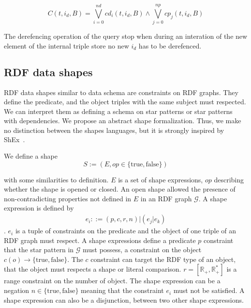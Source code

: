 \begin{equation}\label{eq:cReachabilityCriteria}
    C(t, i_d, B)  = \bigvee_{i=0}^{nd}cd_i(t, i_d, B) \land \bigvee_{j=0}^{np}cp_j(t, i_d, B)
\end{equation}

The derefencing operation of the query stop when during an interation of the new element of the internal triple store no new $i_d$ has to be derefenced.

\subsection{RDF data shapes}
RDF data shapes similar to data schema are constraints on RDF graphs.
They define the predicate, and the object triples with the same subject must respected.
We can interpret them as defining a schema on star patterns or star patterns with dependencies.
We propose an abstract shape formalization. Thus, we make no distinction between the shapes languages, but it is strongly inspired by ShEx~\cite{Gayo2018}.~

We define a shape
\begin{equation}
S := (E, op \in \{\mathrm{true},\mathrm{false}\})
\end{equation}

with some similarities to \citeauthor{Abbas2018} definition.
$E$ is a set of shape expressions, $op$ describing whether the shape is opened or closed.
An open shape allowed the presence of non-contradicting properties not defined in $E$ in an RDF graph $\mathcal{G}$.
A shape expression is defined by
\begin{align}
 e_i ::= (p, c, r, n) | (e_j|e_k)
\end{align}
.
$e_i$ is a tuple of constraints on the predicate and the object of one triple of an RDF graph must respect. 
A shape expressions define a predicate $p$ constraint that the star pattern in $\mathcal{G}$ must possess,
a constraint on the object $c(o) \rightarrow \{\mathrm{true}, \mathrm{false}\}$.
The $c$ constraint can target the RDF type of an object, that the object must respects a shape or literal comparison.
$r = [\mathbb{R}_+, \mathbb{R}_+^*]$ is a range constraint on the number of object.
The shape expression can be a negation $n \in \{\mathrm{true}, \mathrm{false}\}$ meaning that the constraint $e_i$ must not be satisfied.
A shape expression can also be a disjunction, between two other shape expressions.
